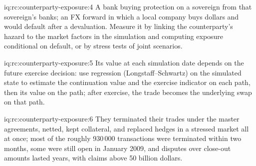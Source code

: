 \begin{solution}{iq:rc:counterparty-exposure:4}
A bank buying protection on a sovereign from that sovereign's banks; an FX forward in which
a local company buys dollars and would default after a devaluation. Measure it by linking the
counterparty's hazard to the market factors in the simulation and computing exposure
conditional on default, or by stress tests of joint scenarios.
\end{solution}

\begin{solution}{iq:rc:counterparty-exposure:5}
Its value at each simulation date depends on the future exercise decision: use regression
(Longstaff--Schwartz) on the simulated state to estimate the continuation value and the
exercise indicator on each path, then its value on the path; after exercise, the trade
becomes the underlying swap on that path.
\end{solution}

\begin{solution}{iq:rc:counterparty-exposure:6}
They terminated their trades under the master agreements, netted, kept collateral, and
replaced hedges in a stressed market all at once; most of the roughly 930\,000 transactions
were terminated within two months, some were still open in January 2009, and disputes over
close-out amounts lasted years, with claims above 50 billion dollars.
\end{solution}

